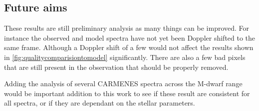 

\subsection{Future aims}These results are still preliminary analysis as many things can be improved.
For instance the observed and model spectra have not yet been Doppler shifted to the same frame. Although a Doppler shift of a few \nm{} would not affect the results shown in \cref{fig:qualitycomparisiontomodel} significantly.
There are also a few bad pixels that are still present in the observation that should be properly removed.

Adding the analysis of several CARMENES spectra across the M-dwarf range would be important addition to this work to see if these result are consistent for all spectra, or if they are dependant on the stellar parameters. 
